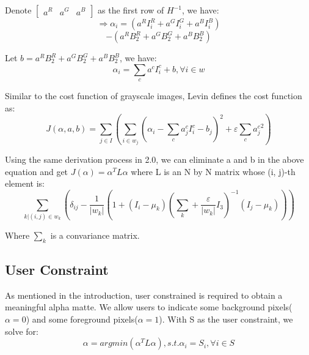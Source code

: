 \documentclass[11pt,letterpaper]{article}
\begin{document}
Denote $\begin{bmatrix} a^R & a^G & a^B \end{bmatrix}$ as the first row of $H^{-1}$, we have: 
$$\Rightarrow \alpha_i = 
(a^RI_i^R + a^GI_i^G + a^BI_i^B) $$
$$-(a^RB_2^R + a^GB_2^G + a^BB_2^B)$$

Let $b = a^RB_2^R + a^GB_2^G + a^BB_2^B$, we have:
$$\alpha_i = \sum_{c}a^cI_i^c + b, \forall i \in w$$

Similar to the cost function of gray­scale images, Levin defines the cost function as:
$$J(\alpha, a, b) = \sum_{j \in I}(\sum_{i \in w_j}(\alpha_i - \sum_c a_j^c I_i^c-b_j)^2+\varepsilon \sum_{c}{a_j^c}^2)$$

Using the same derivation process in 2.0, we can eliminate a and b in the above equation and get $J(\alpha) = \alpha^T L \alpha$ where L is an N by N matrix whose (i, j)-th element is:
$$\sum_{k|(i,j) \in w_k} (\delta_{ij} - \frac{1}{|w_k|}(1 + (I_i - \mu_k)(\sum_k + \frac{\varepsilon}{|w_k|}I_3)^{-1}(I_j - \mu_k)))$$

Where $\sum_k$ is a convariance matrix.
\subsection{User Constraint}
As mentioned in the introduction, user constrained is required to obtain a meaningful alpha matte. We allow users to indicate some background pixels($\alpha = 0$) and some foreground pixels($\alpha = 1$). With S as the user constraint, we solve for:
$$\alpha = argmin(\alpha^T L \alpha), s.t.\alpha_i = S_i, \forall i \in S $$
\end{document}

